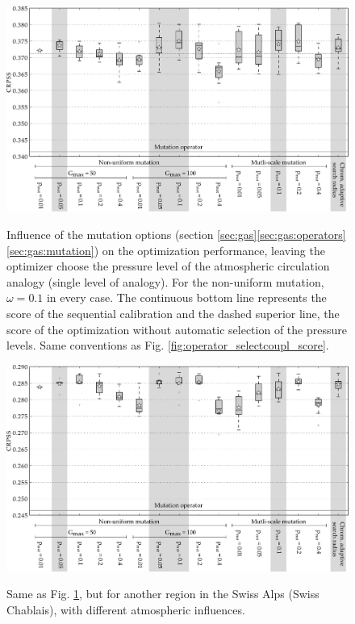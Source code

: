 \documentclass{ametsoc}
\begin{document}
\begin{figure}[t]
	\begin{center}
		\noindent\includegraphics[width=33pc,angle=0]{fig08.pdf}\\
	\end{center}
	\caption{Influence of the mutation options (section \ref{sec:gas}\ref{sec:gas:operators}\ref{sec:gas:mutation}) on the optimization performance, leaving the optimizer choose the pressure level of the atmospheric circulation analogy (single level of analogy). For the non-uniform mutation, $\omega=0.1$ in every case. The continuous bottom line represents the score of the sequential calibration and the dashed superior line, the score of the optimization without automatic selection of the pressure levels. Same conventions as Fig. \ref{fig:operator_selectcoupl_score}.}
	\label{fig:operator_mutation_score_atmlevel}
\end{figure}

\begin{figure}[t]
	\begin{center}
		\noindent\includegraphics[width=33pc,angle=0]{fig09.pdf}\\
	\end{center}
	\caption{Same as Fig. \ref{fig:operator_mutation_score_atmlevel}, but for another region in the Swiss Alps (Swiss Chablais), with different atmospheric influences.}
	\label{fig:operator_mutation_score_rhoneamont}
\end{figure}
\end{document}
